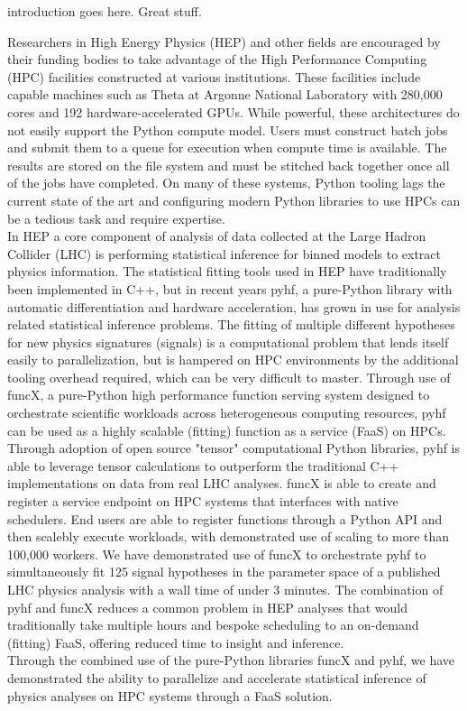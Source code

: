 introduction goes here.
Great stuff.~\cite{ATL-PHYS-PUB-2019-029}

Researchers in High Energy Physics (HEP) and other fields are encouraged by their funding bodies to take advantage of the High Performance Computing (HPC) facilities constructed at various institutions.
These facilities include capable machines such as Theta at Argonne National Laboratory with 280,000 cores and 192 hardware-accelerated GPUs.
While powerful, these architectures do not easily support the Python compute model.
Users must construct batch jobs and submit them to a queue for execution when compute time is available.
The results are stored on the file system and must be stitched back together once all of the jobs have completed.
On many of these systems, Python tooling lags the current state of the art and configuring modern Python libraries to use HPCs can be a tedious task and require expertise.\\

In HEP a core component of analysis of data collected at the Large Hadron Collider (LHC) is performing statistical inference for binned models to extract physics information.
The statistical fitting tools used in HEP have traditionally been implemented in C++, but in recent years pyhf, a pure-Python library with automatic differentiation and hardware acceleration, has grown in use for analysis related statistical inference problems.
The fitting of multiple different hypotheses for new physics signatures (signals) is a computational problem that lends itself easily to parallelization, but is hampered on HPC environments by the additional tooling overhead required, which can be very difficult to master.
Through use of funcX, a pure-Python high performance function serving system designed to orchestrate scientific workloads across heterogeneous computing resources, pyhf can be used as a highly scalable (fitting) function as a service (FaaS) on HPCs.\\

Through adoption of open source "tensor" computational Python libraries, pyhf is able to leverage tensor calculations to outperform the traditional C++ implementations on data from real LHC analyses.
funcX is able to create and register a service endpoint on HPC systems that interfaces with native schedulers.
End users are able to register functions through a Python API and then scalebly execute workloads, with demonstrated use of scaling to more than 100,000 workers.
We have demonstrated use of funcX to orchestrate pyhf to simultaneously fit 125 signal hypotheses in the parameter space of a published LHC physics analysis with a wall time of under 3 minutes.
The combination of pyhf and funcX reduces a common problem in HEP analyses that would traditionally take multiple hours and bespoke scheduling to an on-demand (fitting) FaaS, offering reduced time to insight and inference.\\

Through the combined use of the pure-Python libraries funcX and pyhf, we have demonstrated the ability to parallelize and accelerate statistical inference of physics analyses on HPC systems through a FaaS solution.
